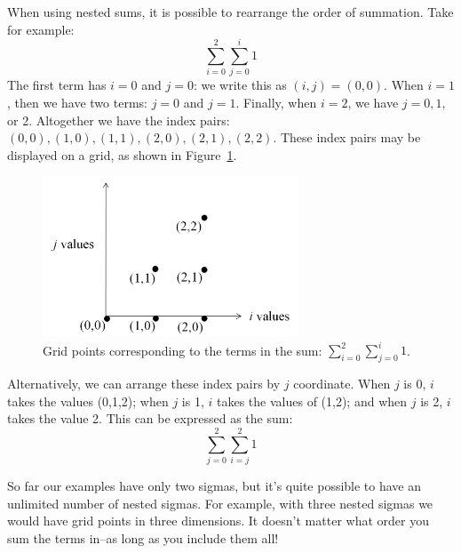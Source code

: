 When using nested sums, it is possible to rearrange the order of summation.  Take for example:
\[\sum_{i=0}^{2}  \sum_{j=0}^{i}1 \]
The first term has $i=0$ and $j=0$: we write this as $(i,j)=(0,0)$. When $i=1$, then we have two terms:  $j=0$ and $j=1$. Finally, when $i=2$, we have $j=0,1,$ or 2.  Altogether we have the index pairs: $(0,0), (1,0), (1,1), (2,0), (2,1), (2,2)$. These index pairs may be displayed on a grid, as shown in Figure~\ref{fig:summation1}.
\begin{figure}[htb]
\begin{center}
	\includegraphics[width=3.0in]{images/i02j0igraph.png}
\caption{\label{fig:summation1} Grid points corresponding to the terms in the sum: $ \sum_{i=0}^{2}  \sum_{j=0}^{i}1 $.}
\end{center}
\end{figure} 

Alternatively, we can arrange these index pairs by $j$ coordinate.  When $j$ is 0, $i$ takes the values (0,1,2); when $j$ is 1, $i$ takes the values of (1,2); and when $j$ is 2, $i$ takes the value 2.  This can be expressed as the sum:
\[\sum_{j=0}^{2} \sum_{i=j}^{2}1 \]

So far our examples have only two sigmas, but it's quite possible to have an unlimited number of nested sigmas. For example, with three nested sigmas we would have grid points in three dimensions.  It doesn't matter what order you sum the terms in--as long as you include them all!

